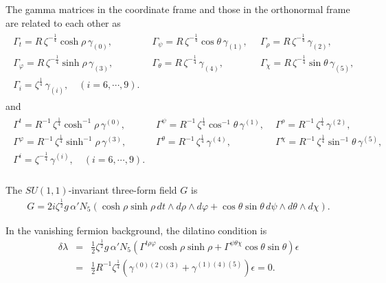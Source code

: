 \documentclass[a4paper,12pt]{article}
\begin{document}
\begin{appendix}
The gamma matrices in the coordinate frame and those in the orthonormal frame are related to each other as
\begin{eqnarray}
\begin{array}{lll}
\Gamma_t=R\,\zeta^{-\frac{1}{4}}\cosh{\rho}\,\gamma_{(0)},&\,\,\,
\Gamma_\psi=R\,\zeta^{-\frac{1}{4}}\cos{\theta}\,\gamma_{(1)},&\,\,\,
\Gamma_\rho=R\,\zeta^{-\frac{1}{4}}\,\gamma_{(2)},\\
\Gamma_\varphi=R\,\zeta^{-\frac{1}{4}}\sinh{\rho}\,\gamma_{(3)},&\,\,\,
\Gamma_\theta=R\,\zeta^{-\frac{1}{4}}\,\gamma_{(4)},&\,\,\,
\Gamma_\chi=R\,\zeta^{-\frac{1}{4}}\sin{\theta}\,\gamma_{(5)},\\
\Gamma_i=\zeta^{\frac{1}{4}}\,\gamma_{(i)},\quad(i=6,\cdots, 9).&
\end{array}
\end{eqnarray}
and
\begin{eqnarray}\label{gammaup}
\begin{array}{lll}
\Gamma^t=R^{-1}\,\zeta^{\frac{1}{4}}\cosh^{-1}{\rho}\,\gamma^{(0)},&\,\,
\Gamma^\psi=R^{-1}\,\zeta^{\frac{1}{4}}\cos^{-1}{\theta}\,\gamma^{(1)},&\,\,
\Gamma^\rho=R^{-1}\,\zeta^{\frac{1}{4}}\,\gamma^{(2)},\\
\Gamma^\varphi=R^{-1}\,\zeta^{\frac{1}{4}}\sinh^{-1}{\rho}\,\gamma^{(3)},&\,\,
\Gamma^\theta=R^{-1}\,\zeta^{\frac{1}{4}}\,\gamma^{(4)},&\,\,
\Gamma^\chi=R^{-1}\,\zeta^{\frac{1}{4}}\sin^{-1}{\theta}\,\gamma^{(5)},\nonumber\\
\Gamma^i=\zeta^{-\frac{1}{4}}\,\gamma^{(i)},\quad (i=6,\cdots, 9).&
\end{array}\\
\end{eqnarray}

The $SU(1,1)$-invariant three-form field $G$ is
\begin{eqnarray}
G=2i\zeta^{\frac{1}{2}}g\,\alpha'N_5\left(\cosh{\rho}\sinh{\rho}\,dt\wedge d\rho\wedge d\varphi+\cos{\theta}\sin{\theta}\,d\psi\wedge d\theta\wedge d\chi\right).
\end{eqnarray}

In the vanishing fermion background, the dilatino condition is 
\begin{eqnarray}\label{adsdilatino}
\delta\lambda&=&\frac{1}{2}\zeta^{\frac{1}{2}}g\,\alpha'N_5\left(\Gamma^{t\rho\varphi}\cosh{\rho}\sinh{\rho}+\Gamma^{\psi\theta\chi}\cos{\theta}\sin{\theta}\right)\epsilon\nonumber\\
&=&\frac{1}{2}R^{-1}\zeta^{\frac{1}{4}}\left(\gamma^{(0)(2)(3)}+\gamma^{(1)(4)(5)}\right)\epsilon=0.
\end{eqnarray}


\end{appendix}
\end{document}
